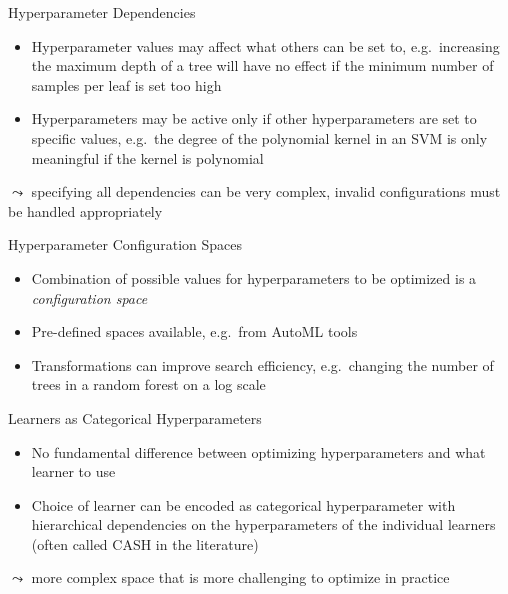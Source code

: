 \documentclass[main]{subfiles}
\begin{document}

\begin{frame}{Hyperparameter Dependencies}
    \begin{itemize}
        \item Hyperparameter values may affect what others can be set to, e.g.\ increasing the maximum depth of a tree will have no effect if the minimum number of samples per leaf is set too high
        \item Hyperparameters may be active only if other hyperparameters are set to specific values, e.g.\ the degree of the polynomial kernel in an SVM is only meaningful if the kernel is polynomial
    \end{itemize}
    $\leadsto$ specifying all dependencies can be very complex, invalid configurations must be handled appropriately
\end{frame}


\begin{frame}{Hyperparameter Configuration Spaces}
    \begin{itemize}
        \item Combination of possible values for hyperparameters to be optimized is a \emph{configuration space}
        \item Pre-defined spaces available, e.g.\ from AutoML tools
        \item Transformations can improve search efficiency, e.g.\ changing the number of trees in a random forest on a log scale
    \end{itemize}
\end{frame}


\begin{frame}{Learners as Categorical Hyperparameters}
    \begin{itemize}
        \item No fundamental difference between optimizing hyperparameters and what learner to use
        \item Choice of learner can be encoded as categorical hyperparameter with hierarchical dependencies on the hyperparameters of the individual learners (often called CASH in the literature)
    \end{itemize}
    $\leadsto$ more complex space that is more challenging to optimize in practice
\end{frame}
\end{document}
